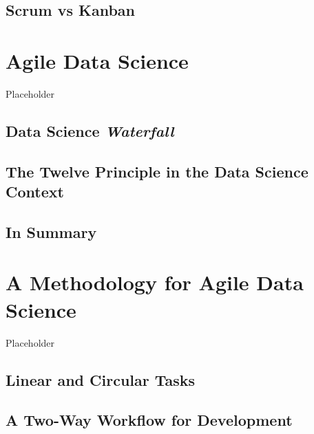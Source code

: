 \documentclass[]{book}
\begin{document}
\hypertarget{scrum-vs-kanban}{%
\section{Scrum vs Kanban}\label{scrum-vs-kanban}}

\hypertarget{agile-data-science}{%
\chapter{Agile Data Science}\label{agile-data-science}}

Placeholder

\hypertarget{data-science-waterfall}{%
\section{\texorpdfstring{Data Science \emph{Waterfall}}{Data Science Waterfall}}\label{data-science-waterfall}}

\hypertarget{the-twelve-principle-in-the-data-science-context}{%
\section{The Twelve Principle in the Data Science Context}\label{the-twelve-principle-in-the-data-science-context}}

\hypertarget{in-summary}{%
\section{In Summary}\label{in-summary}}

\hypertarget{a-methodology-for-agile-data-science}{%
\chapter{A Methodology for Agile Data Science}\label{a-methodology-for-agile-data-science}}

Placeholder

\hypertarget{linear-and-circular-tasks}{%
\section{Linear and Circular Tasks}\label{linear-and-circular-tasks}}

\hypertarget{a-two-way-workflow-for-development}{%
\section{A Two-Way Workflow for Development}\label{a-two-way-workflow-for-development}}
\end{document}
